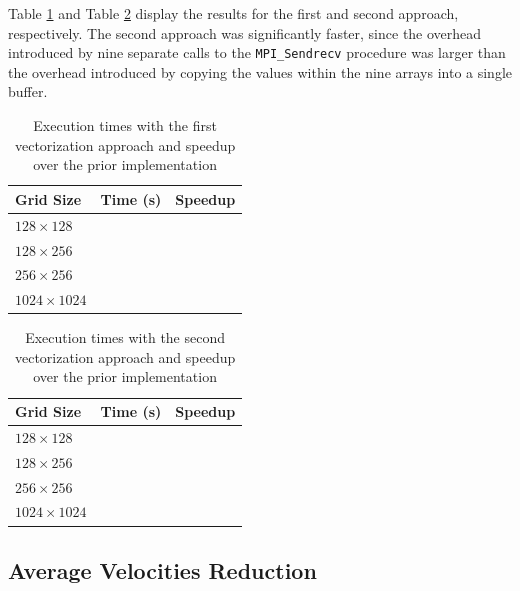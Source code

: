 \documentclass[twocolumn, a4paper]{article}
\begin{document}
Table \ref{tab:vectorization_1} and Table \ref{tab:vectorization_2} display the results for the first and second approach, respectively.
The second approach was significantly faster, since the overhead introduced by nine separate calls to the \texttt{MPI\_Sendrecv} procedure was larger than the overhead introduced by copying the values within the nine arrays into a single buffer.

\begin{table}[htbp]
  \begin{center}
  \caption{Execution times with the first vectorization approach and speedup over the prior implementation}\label{tab:vectorization_1}
  \begin{tabular}[t]{l | l l} 
      \hline\hline
      Grid Size&Time (s)&Speedup\\
      \hline
      $128 \times 128$&\texttt{}&\texttt{}\\
      $128 \times 256$&\texttt{}&\texttt{}\\
      $256 \times 256$&\texttt{}&\texttt{}\\
      $1024 \times 1024$&\texttt{}&\texttt{}\\
      \hline
    \end{tabular}
  \end{center}
\end{table}

\begin{table}[htbp]
  \begin{center}
  \caption{Execution times with the second vectorization approach and speedup over the prior implementation}\label{tab:vectorization_2}
  \begin{tabular}[t]{l | l l} 
      \hline\hline
      Grid Size&Time (s)&Speedup\\
      \hline
      $128 \times 128$&\texttt{}&\texttt{}\\
      $128 \times 256$&\texttt{}&\texttt{}\\
      $256 \times 256$&\texttt{}&\texttt{}\\
      $1024 \times 1024$&\texttt{}&\texttt{}\\
      \hline
    \end{tabular}
  \end{center}
\end{table}

\subsection{Average Velocities Reduction}
\end{document}
